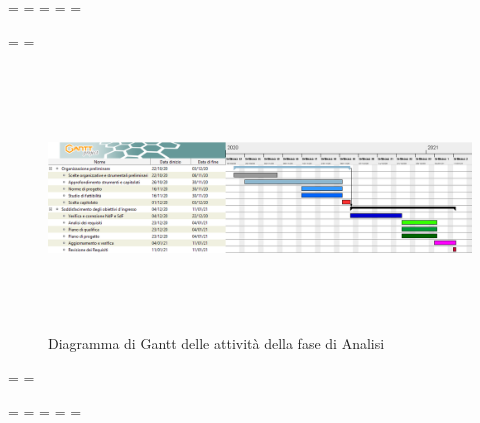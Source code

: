 
\paperwidth=\pdfpageheight
\paperheight=\pdfpagewidth
\pdfpageheight=\paperheight
\pdfpagewidth=\paperwidth
\headwidth=\textheight

\begingroup 
\vsize=\textwidth
\hsize=\textheight

            \pagestyle{empty}
            \begin{figure}[h]
                \centering	
                \includegraphics[height = 7cm, width = 25cm]{./src/Pianificazione/immagini/gantt_Fase1.png}
                \caption{Diagramma di Gantt delle attività della fase di Analisi}
            \end{figure}

            
\textwidth=\hsize
\textheight=\vsize

\endgroup
\newpage
\paperwidth=\pdfpageheight
\paperheight=\pdfpagewidth
\pdfpageheight=\paperheight
\pdfpagewidth=\paperwidth
\headwidth=\textwidth